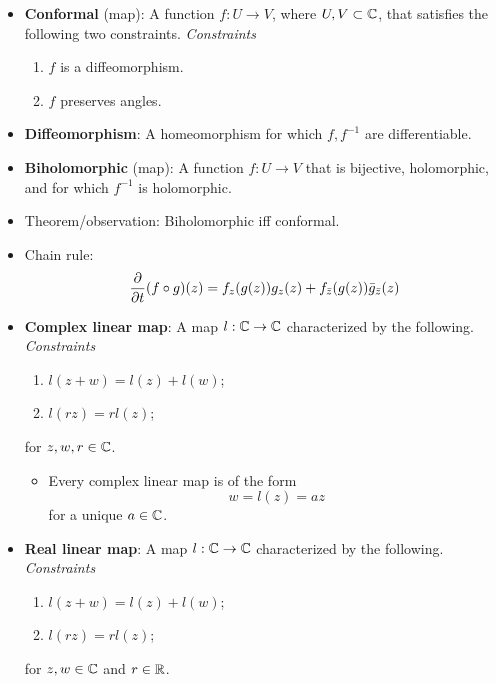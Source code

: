 \documentclass[../notes.tex]{subfiles}
\begin{document}
\begin{itemize}
    \begin{proof}
        Look at the argument at the intersection point and use the chain rule.
    \end{proof}
    \item \textbf{Conformal} (map): A function $f:U\to V$, where $U,V\subset\mathbb{C}$, that satisfies the following two constraints. \emph{Constraints}
    \begin{enumerate}
        \item $f$ is a diffeomorphism.
        \item $f$ preserves angles.
    \end{enumerate}
    \item \textbf{Diffeomorphism}: A homeomorphism for which $f,f^{-1}$ are differentiable.
    \item \textbf{Biholomorphic} (map): A function $f:U\to V$ that is bijective, holomorphic, and for which $f^{-1}$ is holomorphic.
    \item Theorem/observation: Biholomorphic iff conformal.
    \item Chain rule:
    \begin{equation*}
        \pdv{t}(f\circ g)(z) = f_z(g(z))g_z(z)+f_{\bar{z}}(g(z))\bar{g}_{\bar{z}}(z)
    \end{equation*}
    \item \textbf{Complex linear map}: A map $l:\mathbb{C}\to\mathbb{C}$ characterized by the following. \emph{Constraints}
    \begin{enumerate}
        \item $l(z+w)=l(z)+l(w)$;
        \item $l(rz)=rl(z)$;
    \end{enumerate}
    for $z,w,r\in\mathbb{C}$.
    \begin{itemize}
        \item Every complex linear map is of the form
        \begin{equation*}
            w = l(z) = az
        \end{equation*}
        for a unique $a\in\mathbb{C}$.
    \end{itemize}
    \item \textbf{Real linear map}: A map $l:\mathbb{C}\to\mathbb{C}$ characterized by the following. \emph{Constraints}
    \begin{enumerate}
        \item $l(z+w)=l(z)+l(w)$;
        \item $l(rz)=rl(z)$;
    \end{enumerate}
    for $z,w\in\mathbb{C}$ and $r\in\mathbb{R}$.

\end{itemize}
\end{document}

